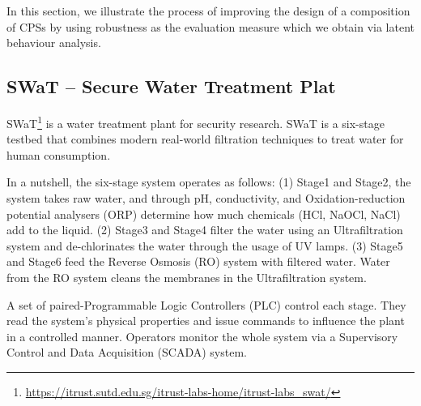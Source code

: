 {%
In this section, we illustrate the process of improving the design of a composition of CPSs by using robustness as the evaluation measure which we obtain via latent behaviour analysis.
\subsection{SWaT -- Secure Water Treatment Plat}

SWaT\footnote{\url{https://itrust.sutd.edu.sg/itrust-labs-home/itrust-labs_swat/}} is a water treatment plant for security research. SWaT is a six-stage testbed that combines modern real-world filtration techniques to treat water for human consumption. 

In a nutshell, the six-stage system operates as follows:
(1) Stage1 and Stage2, the system takes raw water, and through pH, conductivity, and Oxidation-reduction potential analysers (ORP) determine how much chemicals (HCl, NaOCl, NaCl) add to the liquid. 
(2) Stage3 and Stage4 filter the water using an Ultrafiltration system and de-chlorinates the water through the usage of UV lamps. 
(3) Stage5 and Stage6 feed the Reverse Osmosis (RO) system with filtered water. Water from the RO system cleans the membranes in the Ultrafiltration system. 

{%
A set of paired-Programmable Logic Controllers (PLC) control each stage. 
They read the system's physical properties and issue commands to influence the plant in a controlled manner. 
Operators monitor the whole system via a Supervisory Control and Data Acquisition (SCADA) system.

}}
